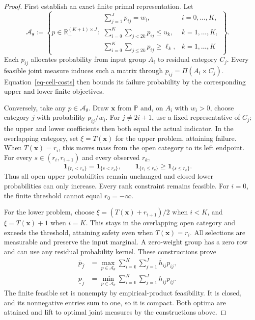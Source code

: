 \begin{proof}
  First establish an exact finite primal representation. Let
  \begin{equation}
    \mathcal A_\theta:=\left\{p\in\mathbb R_+^{(K+1)\times J}:
    \begin{array}{ll}
      \displaystyle\sum_{j=1}^Jp_{ij}=w_i,&i=0,\ldots,K,\\[1mm]
      \displaystyle\sum_{i=0}^K\sum_{j<2k}p_{ij}\le u_k,&k=1,\ldots,K,\\[1mm]
      \displaystyle\sum_{i=0}^K\sum_{j\le2k}p_{ij}\ge\ell_k,&k=1,\ldots,K
    \end{array}\right\}.
    \label{eq-cell-mass-polytope}
  \end{equation}
  Each $p_{ij}$ allocates probability from input group $A_i$ to residual category $C_j$. Every feasible joint measure induces such a matrix through $p_{ij}=\Pi(A_i\times C_j)$. Equation~\eqref{eq-cell-costs} then bounds its failure probability by the corresponding upper and lower finite objectives.

  Conversely, take any $p\in\mathcal A_\theta$. Draw $\bm x$ from $\mathbb P$ and, on $A_i$ with $w_i>0$, choose category $j$ with probability $p_{ij}/w_i$. For $j\ne2i+1$, use a fixed representative of $C_j$; the upper and lower coefficients then both equal the actual indicator. In the overlapping category, set $\xi=T(\bm x)$ for the upper problem, attaining failure. When $T(\bm x)=r_i$, this moves mass from the open category to its left endpoint. For every $s\in(r_i,r_{i+1})$ and every observed $r_k$,
  \begin{equation}
    \mathbf1_{\{r_i<r_k\}}=\mathbf1_{\{s<r_k\}},\qquad
    \mathbf1_{\{r_i\le r_k\}}\ge\mathbf1_{\{s\le r_k\}}.
    \label{eq-endpoint-move}
  \end{equation}
  Thus all open upper probabilities remain unchanged and closed lower probabilities can only increase. Every rank constraint remains feasible. For $i=0$, the finite threshold cannot equal $r_0=-\infty$.

  For the lower problem, choose $\xi=(T(\bm x)+r_{i+1})/2$ when $i<K$, and $\xi=T(\bm x)+1$ when $i=K$. This stays in the overlapping open category and exceeds the threshold, attaining safety even when $T(\bm x)=r_i$. All selections are measurable and preserve the input marginal. A zero-weight group has a zero row and can use any residual probability kernel. These constructions prove
  \begin{align}
    \overline p_{\hat f}
    &=\max_{p\in\mathcal A_\theta}\sum_{i=0}^K\sum_{j=1}^J\overline h_{ij}p_{ij},
    \label{eq-finite-primal-values}\\
    \underline p_{\hat f}
    &=\min_{p\in\mathcal A_\theta}\sum_{i=0}^K\sum_{j=1}^J\underline h_{ij}p_{ij}.
    \label{eq-finite-lower-primal}
  \end{align}
  The finite feasible set is nonempty by empirical-product feasibility. It is closed, and its nonnegative entries sum to one, so it is compact. Both optima are attained and lift to optimal joint measures by the constructions above.


\end{proof}
